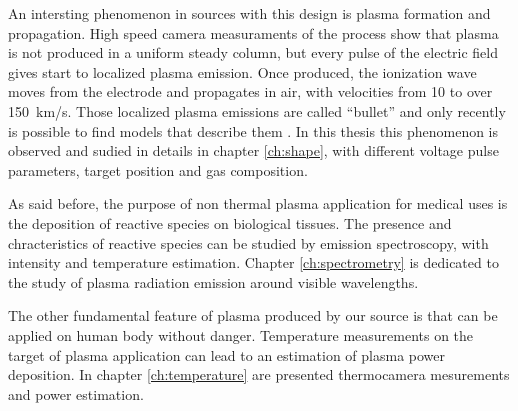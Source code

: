 An intersting phenomenon in sources with this design is plasma formation and propagation. High speed camera measuraments of the process show that plasma is not produced in a uniform steady column, but every pulse of the electric field gives start to localized plasma emission. Once produced, the ionization wave moves from the electrode and propagates in air, with velocities from \num{10} to over \SI{150}{\kilo\meter/\second}. Those localized plasma emissions are called ``bullet'' and only recently is possible to find models that describe them \cite{Lu2016DynamicsOA}.
In this thesis this phenomenon is observed and sudied in details in chapter \ref{ch:shape}, with different voltage pulse parameters, target position and gas composition.


As said before, the purpose of non thermal plasma application for medical uses is the deposition of reactive species on biological tissues. The presence and chracteristics of reactive species can be studied by emission spectroscopy, with intensity and temperature estimation. Chapter \ref{ch:spectrometry} is dedicated to the study of plasma radiation emission around visible wavelengths.


The other fundamental feature of plasma produced by our source is that can be applied on human body without danger. Temperature measurements on the target of plasma application can lead to an estimation of plasma power deposition. In chapter \ref{ch:temperature} are presented thermocamera mesurements and power estimation.

